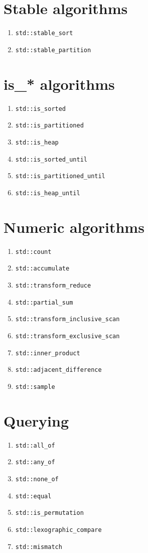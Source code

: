 \documentclass{article}
\begin{document}
\begin{multicols}{3}
\section{Stable algorithms}
\begin{enumerate}[resume]
\setlength\itemsep{0em}
\item \texttt{std::stable\_sort}
\item \texttt{std::stable\_partition}
\end{enumerate}
\section{is\_* algorithms}
\begin{enumerate}[resume]
\setlength\itemsep{0em}
\item \texttt{std::is\_sorted}
\item \texttt{std::is\_partitioned}
\item \texttt{std::is\_heap}
\item \texttt{std::is\_sorted\_until}
\item \texttt{std::is\_partitioned\_until}
\item \texttt{std::is\_heap\_until}
\end{enumerate}

\section{Numeric algorithms}
\begin{enumerate}[resume]
\setlength\itemsep{0em}
\item \texttt{std::count}
\item \texttt{std::accumulate}
\item \texttt{std::transform\_reduce}
\item \texttt{std::partial\_sum}
\item \small{\texttt{std::transform\_inclusive\_scan}}
\item \small{\texttt{std::transform\_exclusive\_scan}}
\item \texttt{std::inner\_product}
\item \texttt{std::adjacent\_difference}
\item \texttt{std::sample}
\end{enumerate}

\section{Querying}
\begin{enumerate}[resume]
\setlength\itemsep{0em}
\item \texttt{std::all\_of}
\item \texttt{std::any\_of}
\item \texttt{std::none\_of}
\item \texttt{std::equal}
\item \texttt{std::is\_permutation}
\item \texttt{std::lexographic\_compare}
\item \texttt{std::mismatch}
\end{enumerate}


\end{multicols}
\end{document}
